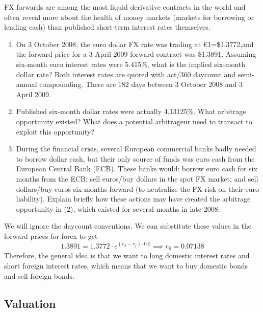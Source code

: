 \documentclass{article}
\begin{document}
    \begin{exercise}
      FX forwards are among the most liquid derivative contracts in the world and often reveal more about the health of money markets (markets for borrowing or lending cash) than published short-term interest rates themselves.
      \begin{enumerate}
        \item On 3 October 2008, the euro dollar FX rate was trading at €1=\$1.3772,and the forward price for a 3 April 2009 forward contract was \$1.3891. Assuming six-month euro interest rates were 5.415\%, what is the implied six-month dollar rate? Both interest rates are quoted with act/360 daycount and semi-annual compounding. There are 182 days between 3 October 2008 and 3 April 2009.
        \item Published six-month dollar rates were actually 4.13125\%. What arbitrage opportunity existed? What does a potential arbitrageur need to transact to exploit this opportunity?
        \item During the financial crisis, several European commercial banks badly needed to borrow dollar cash, but their only source of funds was euro cash from the European Central Bank (ECB). These banks would: borrow euro cash for six months from the ECB; sell euros/buy dollars in the spot FX market; and sell dollars/buy euros six months forward (to neutralize the FX risk on their euro liability). Explain briefly how these actions may have created the arbitrage opportunity in (2), which existed for several months in late 2008.
      \end{enumerate}
    \end{exercise}

    \begin{solution}[Blyth 2.4]
      We will ignore the daycount conventions. We can substitute these values in the forward prices for forex to get 
      \begin{equation}
        1.3891 = 1.3772 \cdot e^{(r_{\$} - r_f) \cdot 0.5} \implies r_{\$} = 0.07138
      \end{equation}
      Therefore, the general idea is that we want to long domestic interest rates and short foreign interest rates, which means that we want to buy domestic bonds and sell foreign bonds.  
    \end{solution}

  \subsection{Valuation}
\end{document}
